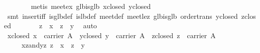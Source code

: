 \begin{isabellebody}
\ \ \ \ \ \ \isamarkupfalse%
\ {}metis\ meet{}ex\ glb{}is{}glb\ x{}closed\ y{}closed{}\isanewline
\ \ \ \ \ \ \isamarkupfalse%
\ {}smt\ insert{}iff\ is{}glb{}def\ is{}lb{}def\ meet{}def\ meet{}le{}z\ glb{}is{}glb\ order{}trans\ y{}closed\ z{}closed{}\isanewline
\ \ \ \ \isamarkupfalse%
\ \isamarkupfalse%
\ {}z\ {}\ x\ {}\ z\ {}\ y{}\ \isamarkupfalse%
\ auto\isanewline
\ \ \isamarkupfalse%
\isanewline
\ \ \ \ \isamarkupfalse%
\ x{}closed{}\ {}x\ {}\ carrier\ A{}\ \ y{}closed{}\ {}y\ {}\ carrier\ A{}\ \ z{}closed{}\ {}z\ {}\ carrier\ A{}\isanewline
\ \ \ \ \ xz{}and{}yz{}\ {}z\ {}\ x\ {}\ z\ {}\ y{}\isanewline

\end{isabellebody}
